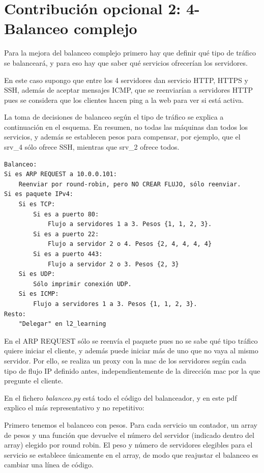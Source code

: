 \documentclass{article}
\begin{document}
\section{Contribución opcional 2: 4-Balanceo complejo}

Para la mejora del balanceo complejo primero hay que definir qué tipo de tráfico se balanceará, y para eso hay que saber qué servicios ofrecerían los servidores.

En este caso supongo que entre los 4 servidores dan servicio HTTP, HTTPS y SSH, además de aceptar mensajes ICMP, que se reenviarían a servidores HTTP pues se considera que los clientes hacen ping a la web para ver si está activa.

La toma de decisiones de balanceo según el tipo de tráfico se explica a continuación en el esquema. En resumen, no todas las máquinas dan todos los servicios, y además se establecen pesos para compensar, por ejemplo, que el srv\_4 sólo ofrece SSH, mientras que srv\_2 ofrece todos.

\begin{BVerbatim}
Balanceo:
Si es ARP REQUEST a 10.0.0.101:
	Reenviar por round-robin, pero NO CREAR FLUJO, sólo reenviar.
Si es paquete IPv4:
	Si es TCP:
		Si es a puerto 80:
			Flujo a servidores 1 a 3. Pesos {1, 1, 2, 3}.
		Si es a puerto 22:
			Flujo a servidor 2 o 4. Pesos {2, 4, 4, 4, 4}
		Si es a puerto 443:
			Flujo a servidor 2 o 3. Pesos {2, 3}
	Si es UDP:
		Sólo imprimir conexión UDP.
	Si es ICMP:
		Flujo a servidores 1 a 3. Pesos {1, 1, 2, 3}.
Resto:
	"Delegar" en l2_learning
\end{BVerbatim}

En el ARP REQUEST sólo se reenvía el paquete pues no se sabe qué tipo tráfico quiere iniciar el cliente, y además puede iniciar más de uno que no vaya al mismo servidor. Por ello, se realiza un proxy con la mac de los servidores según cada tipo de flujo IP definido antes, independientemente de la dirección mac por la que pregunte el cliente.

\hfill

En el fichero \textit{balanceo.py} está todo el código del balanceador, y en este pdf explico el más representativo y no repetitivo:

Primero tenemos el balanceo con pesos. Para cada servicio un contador, un array de pesos y una función que devuelve el número del servidor (indicado dentro del array) elegido por round robin. El peso y número de servidores elegibles para el servicio se establece únicamente en el array, de modo que reajustar el balanceo es cambiar una línea de código.
\end{document}
